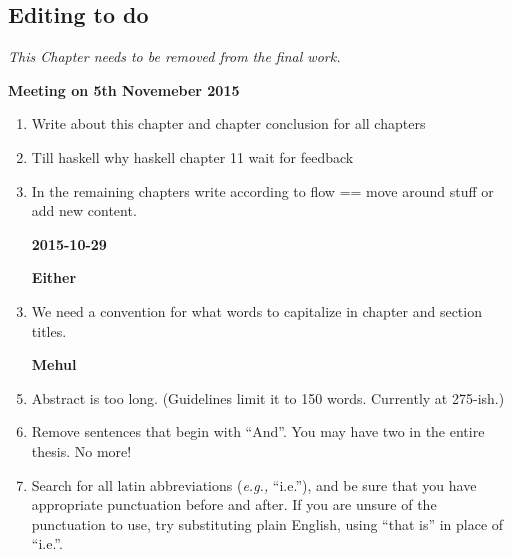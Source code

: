 
\begin{scope}
\nolinenumbers
\chapter{Editing to do}\label{chap:to-do}

\textit{\color{red} This Chapter needs to be removed from the final
  work.}

\textbf{Meeting on 5th Novemeber 2015} 
\begin{enumerate}
\item Write about this chapter and chapter conclusion for all chapters

\item Till haskell why haskell chapter 11 wait for feedback

\item In the remaining chapters write according to flow == move around stuff or add new content.
\end{enumerate}

\begin{enumerate}
\item [\textbf{2015-10-29}]
\item [\textbf{Either}]
\item
  We need a convention for what words to capitalize in chapter and
  section titles.

\item [\textbf{Mehul}]

\item
  Abstract is too long.  (Guidelines limit it to 150 words.  Currently
  at 275-ish.)

\item
  Remove sentences that begin with ``And''.
  You may have two in the entire thesis.
  No more!\label{item:no-and}

\item
  Search for all latin abbreviations (\textit{e.g.,} ``i.e.''), and be
  sure that you have appropriate punctuation before and after.
  If you are unsure of the punctuation to use, try substituting plain
  English,  using ``that is'' in place
  of ``i.e.''.


\end{enumerate}
\end{scope}
